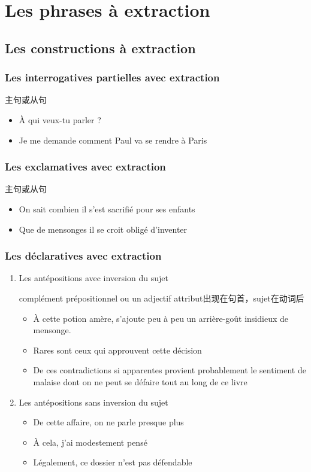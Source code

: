 \documentclass[UTF8]{report}
\begin{document}
\section{Les phrases à extraction}
\subsection{Les constructions à extraction}

\subsubsection{Les interrogatives partielles avec extraction}
主句或从句
\begin{itemize}
    \item À qui veux-tu parler ?
    \item Je me demande comment Paul va se rendre à Paris
\end{itemize}
\subsubsection{Les exclamatives avec extraction}
主句或从句
\begin{itemize}
    \item On sait combien il s’est sacrifié pour ses enfants
    \item Que de mensonges il se croit obligé d’inventer
\end{itemize}
\subsubsection{Les déclaratives avec extraction}
\begin{enumerate}
    \item Les antépositions avec inversion du sujet
    
    complément prépositionnel ou un adjectif attribut出现在句首，sujet在动词后 
    \begin{itemize}
        \item À cette potion amère, s’ajoute peu à peu un arrière-goût insidieux de mensonge.
        \item Rares sont ceux qui approuvent cette décision
        \item De ces contradictions si apparentes provient probablement le sentiment de malaise dont on ne peut se défaire tout au long de ce livre
    \end{itemize}
    \item Les antépositions sans inversion du sujet
    \begin{itemize}
        \item De cette affaire, on ne parle presque plus
        \item À cela, j’ai modestement pensé
        \item Légalement, ce dossier n’est pas défendable
    \end{itemize}
\end{enumerate}
\end{document}
